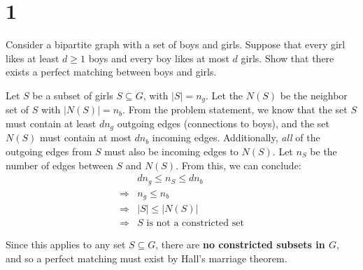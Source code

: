 \section*{1}
Consider a bipartite graph with a set of boys and girls. Suppose that every girl likes at least $d\geq 1$ boys and every boy likes at most $d$ girls. Show that there exists a perfect matching between boys and girls.
\probLine

Let $S$ be a subset of girls $S \subseteq G$, with $|S|=n_g$. Let the $N(S)$ be the neighbor set of $S$ with $|N(S)|=n_b$. From the problem statement, we know that the set $S$ must contain at least $dn_g$ outgoing edges (connections to boys), and the set $N(S)$ must contain at most $dn_b$ incoming edges. Additionally, \textit{all} of the outgoing edges from $S$ must also be incoming edges to $N(S)$. Let $n_S$ be the number of edges between $S$ and $N(S)$. From this, we can conclude:
\begin{align*}
&dn_g \leq n_S \leq dn_b\\
\Rightarrow & n_g \leq n_b\\
\Rightarrow & |S| \leq |N(S)|\\
\Rightarrow & S \text{ is not a constricted set}
\end{align*}

Since this applies to any set $S \subseteq G$, there are \textbf{no constricted subsets in $G$}, and so a perfect matching must exist by Hall's marriage theorem.
